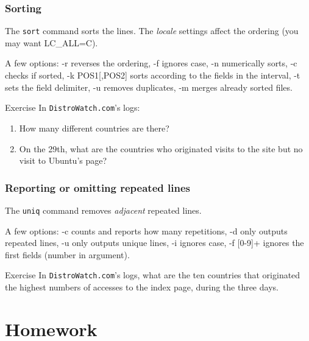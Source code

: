\documentclass{beamer}
\begin{document}
\begin{frame}
  \frametitle{Sorting}
  The \texttt{sort} command sorts the lines.  The \emph{locale}
  settings affect the ordering (you may want LC\_ALL=C).

  \vfill

  A few options: -r reverses the ordering, -f ignores case, -n
  numerically sorts, -c checks if sorted, -k POS1[,POS2] sorts
  according to the fields in the interval, -t sets the field
  delimiter, -u removes duplicates, -m merges already sorted files.

  \vfill
  \pause

  \begin{exampleblock}{Exercise}
    In \texttt{DistroWatch.com}'s logs:
    \begin{enumerate}
    \item How many different countries are there?
    \item On the 29th, what are the countries who originated visits to
      the site but no visit to Ubuntu's page?
    \end{enumerate}
  \end{exampleblock}
\end{frame}

\begin{frame}
  \frametitle{Reporting or omitting repeated lines}
  The \texttt{uniq} command removes \emph{adjacent} repeated lines.

  \vfill

  A few options: -c counts and reports how many repetitions, -d only
  outputs repeated lines, -u only outputs unique lines, -i ignores
  case, -f [0-9]+ ignores the first fields (number in argument).

  \vfill
  \pause

  \begin{exampleblock}{Exercise}
    In \texttt{DistroWatch.com}'s logs, what are the ten countries
    that originated the highest numbers of accesses to the index page,
    during the three days.
  \end{exampleblock}
\end{frame}

\section*{Homework}
\end{document}

